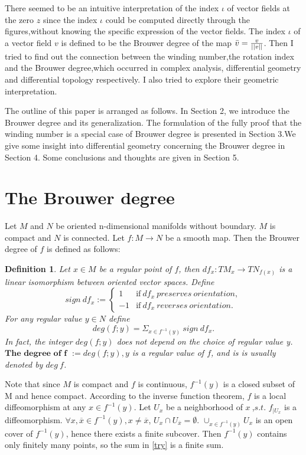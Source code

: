 \documentclass[11pt]{article}
\newtheorem{definition}{Definition}
\numberwithin{equation}{section} \numberwithin{theorem}{section}
\numberwithin{lemma}{section} \numberwithin{remark}{section}
\numberwithin{table}{section} \numberwithin{corollary}{section}
\numberwithin{example}{section} \numberwithin{conjecture}{section}
\numberwithin{assumption}{section}
\numberwithin{definition}{section}
\numberwithin{proposition}{section}
\renewcommand{\o}{\emptyset}
\begin{document}
There seemed to be an intuitive interpretation of the  index $ \iota$ of vector fields at the zero $z$ since the index $\iota$ could be computed  directly  through the figures,without knowing the specific expression of the vector fields. The index $\iota$ of a vector field $v$ is defined to be the Brouwer degree of  the map $\Bar{v}=\frac{v}{||v||}$. Then I tried to find out the connection between the winding number,the rotation index and the Brouwer degree,which occurred in complex analysis, differential geometry and differential topology respectively. I also tried to explore their geometric interpretation.

The outline of this paper is arranged as follows. In Section 2, we introduce the Brouwer degree and its generalization. The formulation of the fully proof that the winding number is a special case of Brouwer degree is presented in Section 3.We give some insight into differential geometry concerning the Brouwer degree in Section 4. Some conclusions and thoughts are given in Section 5.


\section{The Brouwer degree}
Let $M$ and $N$ be oriented n-dimensional manifolds without boundary. $M$ is compact and $N$ is connected. Let $f: M \rightarrow N$ be a smooth map. Then the Brouwer degree of $f$ is defined as follows:
\begin{definition}
Let $x\in M$ be a regular point of $f$, then $df_x: TM_x\rightarrow TN_{f(x)}$ is a linear isomorphism between oriented vector spaces.
Define
\begin{equation*}
    sign\  df_x:=\left\{\begin{array}{ll}
1 &\text{if}~df_x \  preserves\  orientation,
\\[0.1in]
-1 &\text{if}~df_x\  reverses\  orientation.
\end{array}\right. 
\end{equation*}
For any regular value $y \in N$ define 
\begin{equation}\label{try}
    deg(f;y)=\Sigma_{x\in f^{-1}(y)}\  sign\ df_x.
\end{equation}
In fact, the integer $deg(f;y)$ does not depend on the choice of regular value y\cite[$\S 5 \ Theorem A$]{milnor1997topology}. $\textbf{The degree of f}$ $:= deg(f;y),y$ is a regular value of $f$, and is  is usually denoted by $deg \ f$.
\end{definition}Note that since $M$ is compact and $f$ is continuous, $f^{-1}(y)$ is a closed subset of M and hence compact. According to the inverse function theorem, $f$ is a local diffeomorphism at any $x\in f^{-1}(y)$. Let $U_x$ be a neighborhood of $x\ $,$s.t. $ $f_{| U_x}$ is a diffeomorphism. 
$  \forall x, \overline{x} \in f^{-1}(y), x \neq \overline{x} $, $U_x \cap U_{\overline{x}}=\o$. $\cup_{x\in f^{-1}(y)} U_x$ is an open cover of $f^{-1}(y)$, hence there exists a finite subcover.
Then $f^{-1}(y)$ contains only finitely many points, so the sum in \ref{try} is a finite sum.
\end{document}
